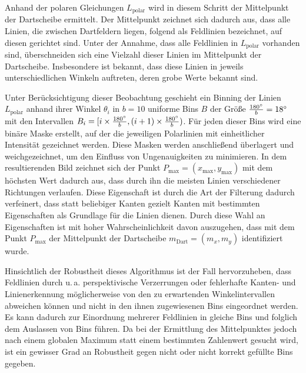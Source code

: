 Anhand der polaren Gleichungen $L_\text{polar}$ wird in diesem Schritt der Mittelpunkt der Dartscheibe ermittelt. Der Mittelpunkt zeichnet sich dadurch aus, dass alle Linien, die zwischen Dartfeldern liegen, folgend als Feldlinien bezeichnet, auf diesen gerichtet sind. Unter der Annahme, dass alle Feldlinien in $L_\text{polar}$ vorhanden sind, überschneiden sich eine Vielzahl dieser Linien im Mittelpunkt der Dartscheibe. Insbesondere ist bekannt, dass diese Linien in jeweils unterschiedlichen Winkeln auftreten, deren grobe Werte bekannt sind.

Unter Berücksichtigung dieser Beobachtung geschieht ein Binning der Linien $L_\text{polar}$ anhand ihrer Winkel $\theta_i$ in $b=10$ uniforme Bins $B$ der Größe $\frac{180^{\circ}}{b}=18^{\circ}$ mit den Intervallen $ B_i = [i \times \frac{180^{\circ}}{b}, (i+1) \times \frac{180^{\circ}}{b})$. Für jeden dieser Bins wird eine binäre Maske erstellt, auf der die jeweiligen Polarlinien mit einheitlicher Intensität gezeichnet werden. Diese Masken werden anschließend überlagert und weichgezeichnet, um den Einfluss von Ungenauigkeiten zu minimieren. In dem resultierenden Bild zeichnet sich der Punkt $P_\text{max} = (x_\text{max}, y_\text{max})$ mit dem höchsten Wert dadurch aus, dass durch ihn die meisten Linien verschiedener Richtungen verlaufen. Diese Eigenschaft ist durch die Art der Filterung dadurch verfeinert, dass statt beliebiger Kanten gezielt Kanten mit bestimmten Eigenschaften als Grundlage für die Linien dienen. Durch diese Wahl an Eigenschaften ist mit hoher Wahrscheinlichkeit davon auszugehen, dass mit dem Punkt $P_\text{max}$ der Mittelpunkt der Dartscheibe $m_\text{Dart}=(m_x, m_y)$ identifiziert wurde.

Hinsichtlich der Robustheit dieses Algorithmus ist der Fall hervorzuheben, dass Feldlinien durch u.\,a. perspektivische Verzerrungen oder fehlerhafte Kanten- und Linienerkennung möglicherweise von den zu erwartenden Winkelintervallen abweichen können und nicht in den ihnen zugewiesenen Bins eingeordnet werden. Es kann dadurch zur Einordnung mehrerer Feldlinien in gleiche Bins und folglich dem Auslassen von Bins führen. Da bei der Ermittlung des Mittelpunktes jedoch nach einem globalen Maximum statt einem bestimmten Zahlenwert gesucht wird, ist ein gewisser Grad an Robustheit gegen nicht oder nicht korrekt gefüllte Bins gegeben.

